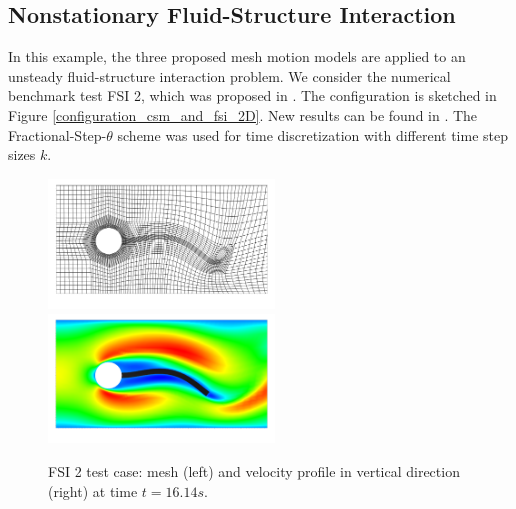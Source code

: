 \documentclass[prodmode,acmtoms]{acmsmall}
\numberwithin{equation}{section}
\begin{document}
\subsection{Nonstationary Fluid-Structure Interaction}
In this example, the three proposed mesh motion models are applied 
to an unsteady fluid-structure interaction problem. We consider 
the numerical benchmark test FSI 2, which was proposed in \cite{HrTu06b}. 
The configuration is 
sketched in Figure \ref{configuration_csm_and_fsi_2D}.
New results can be found in \cite{BuSc06, TuHrMaRaWoAc10, DeHaeAnnBrVie10}. 
The Fractional-Step-$\theta$ scheme was used for time discretization with
different time step sizes $k$. 

\begin{figure}[h]
\centering
{\includegraphics[width=6cm]{Pictures/visit_fsi_2_CNn_t_2e-2_global_3_biharmonic_mesh8070_scale.png}}
{\includegraphics[width=6cm]{Pictures/visit_fsi_2_CNn_t_2e-2_global_3_biharmonic_x_velo8070_scale.png}}
\caption{FSI 2 test case: mesh (left) and velocity profile in vertical 
direction (right) at time $t=16.14s$.}
\label{res:fsi_2_mesh_and_x_velo}
\end{figure}
\end{document}
